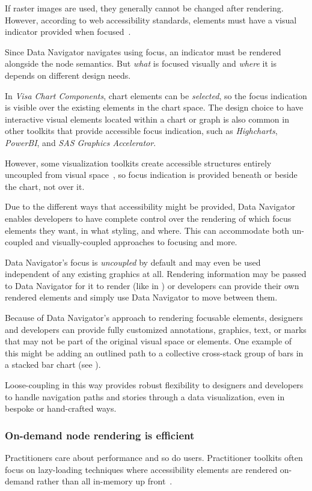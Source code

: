 \documentclass[12pt]{cmuthesis}
\begin{document}
If raster images are used, they generally cannot be changed after rendering. However, according to web accessibility standards, elements must have a visual indicator provided when focused~\cite{WAI2016Focus}.

Since Data Navigator navigates using focus, an indicator must be rendered alongside the node semantics. But \textit{what} is focused visually and \textit{where} it is depends on different design needs.

In \textit{Visa Chart Components}, chart elements can be \textit{selected}, so the focus indication is visible over the existing elements in the chart space. The design choice to have interactive visual elements located within a chart or graph is also common in other toolkits that provide accessible focus indication, such as \textit{Highcharts}, \textit{PowerBI}, and \textit{SAS Graphics Accelerator}.

However, some visualization toolkits create accessible structures entirely uncoupled from visual space~\cite{Blanco2022olli}, so focus indication is provided beneath or beside the chart, not over it.

Due to the different ways that accessibility might be provided, Data Navigator enables developers to have complete control over the rendering of which focus elements they want, in what styling, and where. This can accommodate both un-coupled and visually-coupled approaches to focusing and more.

Data Navigator's focus is \textit{uncoupled} by default and may even be used independent of any existing graphics at all. Rendering information may be passed to Data Navigator for it to render (like in ) or developers can provide their own rendered elements and simply use Data Navigator to move between them.

Because of Data Navigator's approach to rendering focusable elements, designers and developers can provide fully customized annotations, graphics, text, or marks that may not be part of the original visual space or elements. One example of this might be adding an outlined path to a collective cross-stack group of bars in a stacked bar chart (see ).

Loose-coupling in this way provides robust flexibility to designers and developers to handle navigation paths and stories through a data visualization, even in bespoke or hand-crafted ways.

\subsubsection{On-demand node rendering is efficient}
Practitioners care about performance and so do users. Practitioner toolkits often focus on lazy-loading techniques where accessibility elements are rendered on-demand rather than all in-memory up front~\cite{Elavsky2021Method,Zong2022Rich,Blanco2022olli}.
\end{document}
